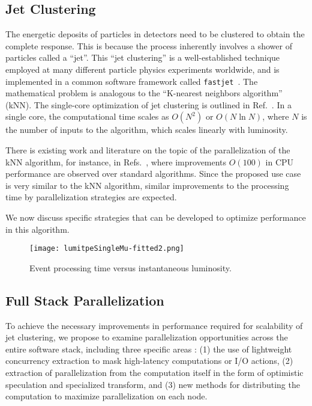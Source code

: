 \documentclass[12pt]{article}
\begin{document}
\subsection{Jet Clustering} 




The energetic deposits of particles in detectors need to be clustered
to obtain the
complete response. This is because the process
inherently involves a shower of particles called a ``jet''. This
``jet clustering'' is a well-established technique employed at
many different particle physics experiments worldwide, and is
implemented in a common software framework called 
{\tt fastjet}~\cite{fastjet_manual}. 
The mathematical problem is analogous to the
``K-nearest neighbors algorithm''~\cite{knn_ieee} (kNN). 
The single-core optimization of
jet clustering
is outlined in Ref.~\cite{fastjet_timing}. In a single core,
the computational time scales as $O(N^2)$ or  $O(N \ln{N})$, where $N$
is the number of inputs to the algorithm, which scales linearly with
luminosity. 

There is existing work and literature on the topic of the
parallelization of the kNN algorithm, for instance, in
Refs.~\cite{knn_gpu_1, knn_gpu_2, knn_gpu_3}, where improvements
$O(100)$ in CPU performance are observed over standard
algorithms. Since the proposed use case is
very similar to the kNN algorithm, similar improvements to the
processing time by parallelization strategies are expected. 

We now discuss specific strategies that can be developed 
to optimize performance in this algorithm. 

\begin{figure}[h!]
    \centering
    \texttt{[image: lumitpeSingleMu-fitted2.png]}
    \caption{\label{lumitpeSingleMu} Event processing time versus
      instantaneous luminosity.}
\end{figure}



\subsection{Full Stack Parallelization}

To achieve the necessary improvements in performance required for scalability
of jet clustering, we propose to examine parallelization opportunities across
the entire software stack, including three specific areas : 
(1) the use of lightweight concurrency
extraction to mask high-latency computations or I/O actions, 
(2) extraction of
parallelization from the computation itself in the form of optimistic speculation
and specialized transform, and
(3) new methods for distributing the computation to
maximize parallelization on each node. 
\end{document}
